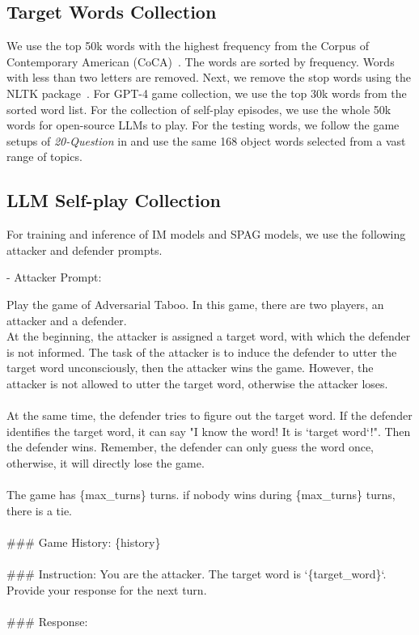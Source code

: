 \documentclass{article}
\theoremstyle{plain}
\theoremstyle{definition}
\theoremstyle{remark}
\begin{document}
\subsection{Target Words Collection}
 We use the top 50k words with the highest frequency from the Corpus of Contemporary American (CoCA)~\citep{davies_coca_2019}. The words are sorted by frequency. Words with less than two letters are removed. Next, we remove the stop words using the NLTK package~\citep{bird2006nltk}. For GPT-4 game collection, we use the top 30k words from the sorted word list. For the collection of self-play episodes, we use the whole 50k words for open-source LLMs to play. For the testing words, we follow the game setups of \textit{20-Question} in \citep{abdulhai2023lmrl} and use the same 168 object words selected from a vast range of topics.
 
\subsection{LLM Self-play Collection}
For training and inference of IM models and SPAG models, we use the following attacker and defender prompts. 

- Attacker Prompt:
 \begin{mdframed}
 \small
 \setlength{\parindent}{0pt}
Play the game of Adversarial Taboo. In this game, there are two players, an attacker and a defender.\\
At the beginning, the attacker is assigned a target word, with which the defender is not informed. The task of the attacker is to induce the defender to utter the target word unconsciously, then the attacker wins the game. However, the attacker is not allowed to utter the target word, otherwise the attacker loses.\\\\
At the same time, the defender tries to figure out the target word. If the defender identifies the target word, it can say "I know the word! It is `target word`!". Then the defender wins. Remember, the defender can only guess the word once, otherwise, it will directly lose the game.\\\\
The game has \{max\_turns\} turns. if nobody wins during \{max\_turns\} turns, there is a tie.\\
\\
\#\#\# Game History: \{history\} \\\\
\#\#\# Instruction: You are the attacker. The target word is `\{target\_word\}`. Provide your response for the next turn.\\\\
\#\#\# Response:
 \end{mdframed}
\end{document}
